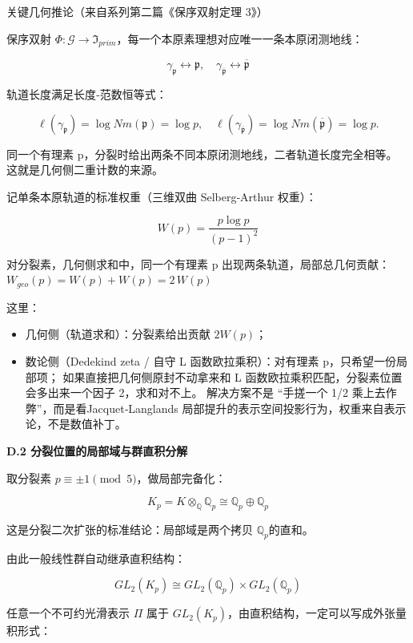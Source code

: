 \documentclass[11pt,a4paper]{ctexart}
\begin{document}
关键几何推论（来自系列第二篇《保序双射定理 3》）

保序双射
\(\Phi:\mathcal{G} \rightarrow \mathfrak{I}_{prim}\)，每一个本原素理想对应唯一一条本原闭测地线：

\[\gamma_{\mathfrak{p}} \leftrightarrow \mathfrak{p},\quad\gamma_{\overline{\mathfrak{p}}} \leftrightarrow \overline{\mathfrak{p}}\]

轨道长度满足长度‑范数恒等式：

\[\ell\left( \gamma_{\mathfrak{p}} \right) = \log{Nm}\left( \mathfrak{p} \right) = \log p,\quad\ell\left( \gamma_{\overline{\mathfrak{p}}} \right) = \log{Nm}\left( \overline{\mathfrak{p}} \right) = \log p.\]

同一个有理素 p，分裂时给出两条不同本原闭测地线，二者轨道长度完全相等。
这就是几何侧二重计数的来源。

记单条本原轨道的标准权重（三维双曲 Selberg‑Arthur 权重）：

\[W(p) = \frac{p\log p}{(p - 1)^{2}}\]

对分裂素，几何侧求和中，同一个有理素 p 出现两条轨道，局部总几何贡献：
\(W_{geo}(p) = W(p) + W(p) = 2\, W(p)\)

这里：

\begin{itemize}
\item
  几何侧（轨道求和）：分裂素给出贡献 \(2W(p)\)；
\item
  数论侧（Dedekind zeta / 自守 L 函数欧拉乘积）：对有理素
  p，只希望一份局部项； 如果直接把几何侧原封不动拿来和 L
  函数欧拉乘积匹配，分裂素位置会多出来一个因子 2，求和对不上。
  解决方案不是 ``手搓一个 1/2 乘上去作弊''，而是看Jacquet‑Langlands
  局部提升的表示空间投影行为，权重来自表示论，不是数值补丁。
\end{itemize}

\textbf{D.2 分裂位置的局部域与群直积分解}

取分裂素
\( p\equiv\pm1 \pmod{5} \)，做局部完备化：

\[K_{p} = K \otimes_{\mathbb{Q}}\mathbb{Q}_{p} \cong \mathbb{Q}_{p} \oplus \mathbb{Q}_{p}\]

这是分裂二次扩张的标准结论：局部域是两个拷贝 \(\mathbb{Q}_{p}\)的直和。

由此一般线性群自动继承直积结构：

\[{GL}_{2}\left( K_{p} \right) \cong {GL}_{2}\left( \mathbb{Q}_{p} \right) \times {GL}_{2}\left( \mathbb{Q}_{p} \right)\]

任意一个不可约光滑表示 \(\Pi\) 属于
\({GL}_{2}\left( K_{p} \right)\)，由直积结构，一定可以写成外张量积形式：
\end{document}

